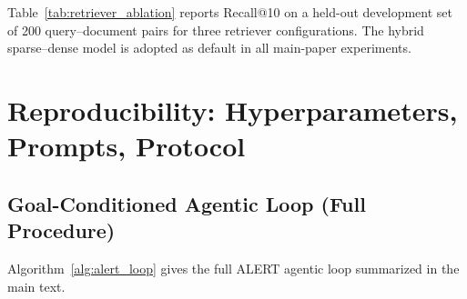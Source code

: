Table~\ref{tab:retriever_ablation} reports Recall@10 on a held-out development set of 200 query--document pairs for three retriever configurations. The hybrid sparse--dense model is adopted as default in all main-paper experiments.

\begin{table}[h]
\centering
\caption{Retriever ablation. Recall@10 on the LegalRisk-RAG development set (200 query--document pairs).}
\label{tab:retriever_ablation}
\small
\setlength{\tabcolsep}{4pt}
\end{table}

\section{Reproducibility: Hyperparameters, Prompts, Protocol}
\label{app:repro}

\subsection{Goal-Conditioned Agentic Loop (Full Procedure)}

Algorithm~\ref{alg:alert_loop} gives the full ALERT agentic loop summarized in the main text.

